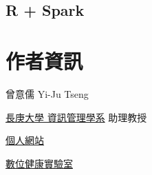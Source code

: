 \documentclass[]{book}
\theoremstyle{definition}
\theoremstyle{definition}
\theoremstyle{remark}
\begin{document}
\section{R + Spark}\label{r-spark}

\chapter*{作者資訊}\label{author}

曾意儒 Yi-Ju Tseng

\href{http://im.cgu.edu.tw/bin/home.php}{長庚大學 資訊管理學系} 助理教授

\href{http://yijutseng.github.io}{個人網站}

\href{http://yijutseng.github.io/Lab/}{數位健康實驗室}


\end{document}
